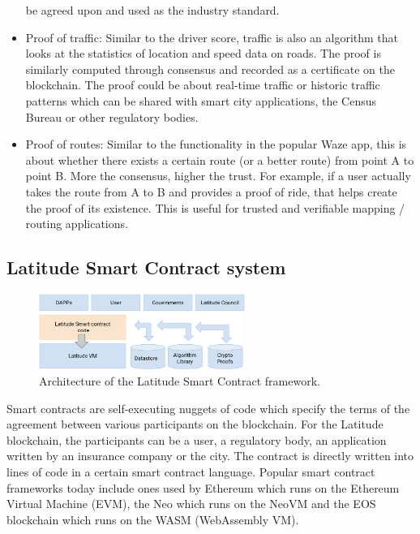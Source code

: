 \begin{itemize}
         be agreed upon and used as the industry standard.
     \item Proof of traffic:  Similar to the driver score, traffic is also an algorithm that looks at the statistics of
         location and speed data on roads. The proof is similarly computed through consensus and recorded as a
         certificate on the blockchain. The proof could be about real-time traffic or historic traffic patterns which
         can be shared with smart city applications, the Census Bureau or other regulatory bodies.
     \item Proof of routes: Similar to the functionality in the popular Waze app, this is about whether there exists a
         certain route (or a better route) from point A to point B. More the consensus, higher the trust. For example,
         if a user actually takes the route from A to B and provides a proof of ride, that helps create the proof of its existence. This is useful
         for trusted and verifiable mapping / routing applications.
 \end{itemize}

\subsection{Latitude Smart Contract system}

\begin{figure}[t]
    \centering
    \includegraphics[width=0.60\textwidth]{lat_sc.png}
  \caption{Architecture of the Latitude Smart Contract framework.}
    \label{fig:lat-sc}
\end{figure}

Smart contracts are self-executing nuggets of code which specify the terms of the agreement between various participants
on the blockchain. For the Latitude blockchain, the participants can be a user, a regulatory body, an application
written by an insurance company or the city. The contract is directly written into lines of code in a certain smart
contract language. Popular smart contract frameworks today include ones used by Ethereum which runs on the Ethereum Virtual Machine (EVM),
the Neo which runs on the NeoVM and the EOS blockchain which runs on the WASM (WebAssembly VM).

